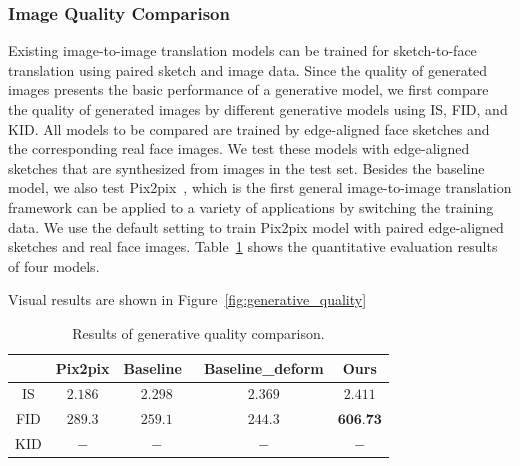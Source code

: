 \subsubsection{Image Quality Comparison}
Existing image-to-image translation models can be trained for sketch-to-face translation using paired sketch and image data. 
Since the quality of generated images presents the basic performance of a generative model, we first compare the quality of generated images by different generative models using IS, FID, and KID. 
All models to be compared are trained by edge-aligned face sketches and the corresponding real face images. 
We test these models with edge-aligned sketches that are synthesized from images in the test set. 
Besides the baseline model, we also test Pix2pix~\cite{pix2pix}, which is the first general image-to-image translation framework can be applied to a variety of applications by switching the training data. 
We use the default setting to train Pix2pix model with paired edge-aligned sketches and real face images. 
%
Table~\ref{tab:generative_quality} shows the quantitative evaluation results of four models. 

Visual results are shown in Figure~\ref{fig:generative_quality}


\begin{table}[h]
	\centering	
	\caption{Results of generative quality comparison.}
	\begin{tabular}{|c|c|c|c|c|}\hline
		& Pix2pix \cite{pix2pix} & Baseline~\cite{pix2pixHD} & Baseline\_deform & Ours \\\hline
		IS & $2.186$ & $2.298$ & $2.369$ & $2.411$\\\hline
		FID & $289.3$ & $259.1$ & $244.3$ & $\textbf{606.73}$\\\hline
		KID & $-$ & $-$ & $-$ & $-$\\\hline
	\end{tabular}
	\label{tab:generative_quality}
\end{table} 

